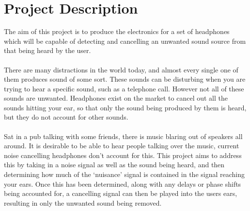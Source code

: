 \section{Project Description}
The aim of this project is to produce the electronics for a set of headphones which will be capable of detecting and cancelling an unwanted sound source from that being heard by the user.
\\
\\
There are many distractions in the world today, and almost every single one of them produces sound of some sort.
These sounds can be disturbing when you are trying to hear a specific sound, such as a telephone call.
However not all of these sounds are unwanted.
Headphones exist on the market to cancel out all the sounds hitting your ear, so that only the sound being produced by them is heard, but they do not account for other sounds.
\\
\\
Sat in a pub talking with some friends, there is music blaring out of speakers all around.
It is desirable to be able to hear people talking over the music, current noise cancelling headphones don't account for this.
This project aims to address this by taking in a noise signal as well as the sound being heard, and then determining how much of the `nuisance' signal is contained in the signal reaching your ears.
Once this has been determined, along with any delays or phase shifts being accounted for, a cancelling signal can then be played into the users ears, resulting in only the unwanted sound being removed.
